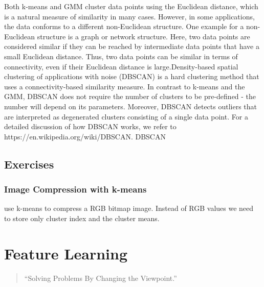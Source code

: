 \documentclass[12pt]{report}
\begin{document}
Both k-means and GMM cluster data points using the Euclidean distance, 
which is a natural measure of similarity in many cases. However, in some 
applications, the data conforms to a different non-Euclidean structure. 
One example for a non-Euclidean structure is a graph or network structure. 
Here, two data points are considered similar if they can be reached by 
intermediate data points that have a small Euclidean distance. Thus, 
two data points can be similar in terms of connectivity, even if their 
Euclidean distance is large.Density-based spatial clustering of 
applications with noise (DBSCAN) is a hard clustering method that 
uses a connectivity-based similarity measure. In contrast to k-means 
and the GMM, DBSCAN does not require the number of clusters to 
be pre-defined -  the number will depend on its parameters. Moreover, 
DBSCAN detects outliers that are interpreted as degenerated clusters 
consisting of a single data point. For a detailed discussion of how 
DBSCAN works, we refer to https://en.wikipedia.org/wiki/DBSCAN.  DBSCAN 

\section{Exercises} 
\subsection{Image Compression with k-means} 
use k-means to compress a RGB bitmap image. Instead of RGB values 
we need to store only cluster index and the cluster means. 

\newpage
\chapter{Feature Learning} 
\label{ch_FeatureLearning}

\begin{quote}
``Solving Problems By Changing the Viewpoint.''
\end{quote}
\end{document}
